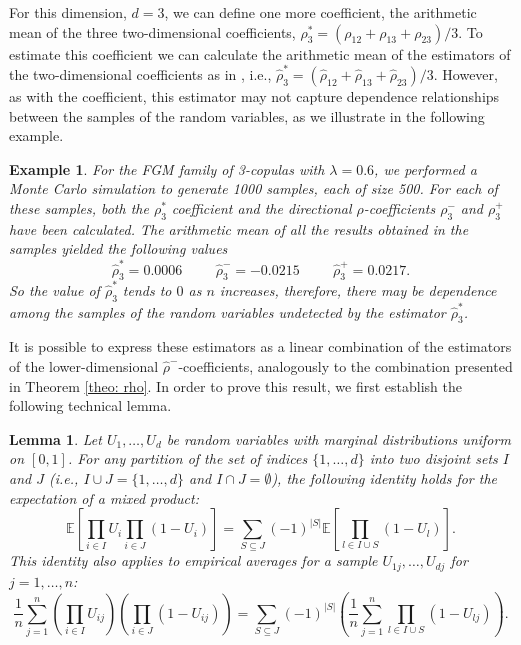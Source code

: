 \documentclass[11pt,a4paper]{article}
\newtheorem{lemma}[theorem]{Lemma}
\newtheorem{example}{Example}
\begin{document}
For this dimension, $d=3$, we can define one more coefficient, the arithmetic mean of the three two-dimensional coefficients, $\rho_3^*=(\rho_{12}+\rho_{13}+\rho_{23})/3$. To estimate this coefficient we can calculate the arithmetic mean of the estimators of the two-dimensional coefficients as in \cite{Gar2013}, i.e., $\widehat{\rho}_3^*=(\widehat{\rho}_{12}+\widehat{\rho}_{13}+\widehat{\rho}_{23})/3$. However, as with the coefficient, this estimator may not capture dependence relationships between the samples of the random variables, as we illustrate in the following example.

\begin{example}
     For the FGM family of 3-copulas with $\lambda=0.6$, we performed a Monte Carlo simulation to generate 1000 samples, each of size 500. For each of these samples, both the $\rho_3^*$ coefficient and the directional $\rho$-coefficients $\rho_3^-$ and $\rho_3^+$ have been calculated. The arithmetic mean of all the results obtained in the samples yielded the following values
     $$\widehat{\rho}_3^*=0.0006\hspace{1cm}\widehat{\rho}_3^-=-0.0215\hspace{1cm}\widehat{\rho}_3^+=0.0217.$$
     So the value of $\widehat{\rho}_3^*$ tends to $0$ as $n$ increases, therefore, there may be dependence among the samples of the random variables undetected by the estimator $\widehat{\rho}_3^*$.
\end{example}


It is possible to express these estimators as a linear combination of the estimators of the lower-dimensional $\widehat{\rho}^-$-coefficients, analogously to the combination presented in Theorem \ref{theo: rho}. In order to prove this result, we first establish the following technical lemma.

\begin{lemma}\label{lem:aux}
\label{lem:generalized_product_decomposition}
Let $U_1, \ldots, U_d$ be random variables with marginal distributions uniform on $[0,1]$. For any partition of the set of indices $\{1, \ldots, d\}$ into two disjoint sets $I$ and $J$ (i.e., $I \cup J = \{1, \ldots, d\}$ and $I \cap J = \emptyset$), the following identity holds for the expectation of a mixed product:
$$ \mathbb{E}\left[ \prod_{i \in I} U_i \prod_{i \in J} (1-U_i) \right] = \sum_{S \subseteq J} (-1)^{|S|} \mathbb{E}\left[ \prod_{l \in I \cup S} (1 - U_l) \right]. $$
This identity also applies to empirical averages for a sample $U_{1j}, \ldots, U_{dj}$ for $j=1, \ldots, n$:
$$ \frac{1}{n}\sum_{j=1}^n \left(\prod_{i \in I} U_{ij}\right) \left(\prod_{i \in J} (1-U_{ij})\right) = \sum_{S \subseteq J} (-1)^{|S|} \left( \frac{1}{n} \sum_{j=1}^n \prod_{l \in I \cup S} (1 - U_{lj}) \right). $$
\end{lemma}
\end{document}
